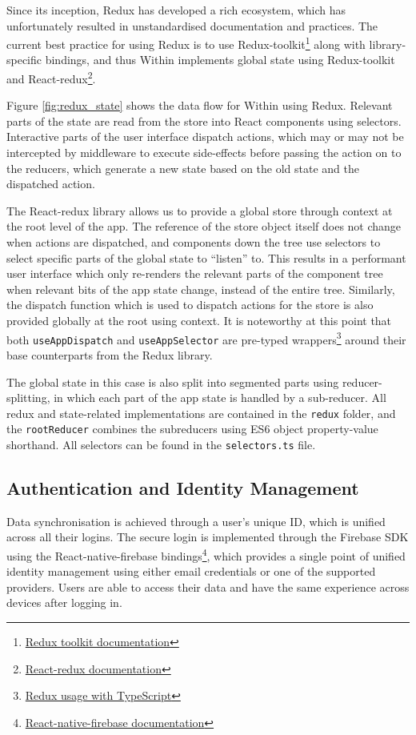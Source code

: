 Since its inception, Redux has developed a rich ecosystem, which has unfortunately resulted in unstandardised documentation and practices. The current best practice for using Redux is to use Redux-toolkit\footnote{\href{https://redux-toolkit.js.org}{Redux toolkit documentation}} along with library-specific bindings, and thus Within implements global state using Redux-toolkit and React-redux\footnote{\href{https://react-redux.js.org}{React-redux documentation}}.

Figure \ref{fig:redux_state} shows the data flow for Within using Redux. Relevant parts of the state are read from the store into React components using selectors. Interactive parts of the user interface dispatch actions, which may or may not be intercepted by middleware to execute side-effects before passing the action on to the reducers, which generate a new state based on the old state and the dispatched action.

The React-redux library allows us to provide a global store through context at the root level of the app. The reference of the store object itself does not change when actions are dispatched, and components down the tree use selectors to select specific parts of the global state to ``listen'' to. This results in a performant user interface which only re-renders the relevant parts of the component tree when relevant bits of the app state change, instead of the entire tree. Similarly, the dispatch function which is used to dispatch actions for the store is also provided globally at the root using context. It is noteworthy at this point that both \texttt{useAppDispatch} and \texttt{useAppSelector} are pre-typed wrappers\footnote{\href{https://redux.js.org/usage/usage-with-TypeScript}{Redux usage with TypeScript}} around their base counterparts from the Redux library.

The global state in this case is also split into segmented parts using reducer-splitting, in which each part of the app state is handled by a sub-reducer. All redux and state-related implementations are contained in the \texttt{redux} folder, and the \texttt{rootReducer} combines the subreducers using ES6 object property-value shorthand. All selectors can be found in the \texttt{selectors.ts} file.


\subsection{Authentication and Identity Management}
Data synchronisation is achieved through a user's unique ID, which is unified across all their logins. The secure login is implemented through the Firebase SDK using the React-native-firebase bindings\footnote{\href{https://rnfirebase.io}{React-native-firebase documentation}}, which provides a single point of unified identity management using either email credentials or one of the supported providers. Users are able to access their data and have the same experience across devices after logging in.

